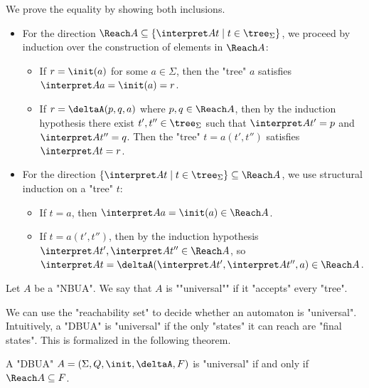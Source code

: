 \documentclass[a4paper,UKenglish,cleveref, autoref, thm-restate]{lipics-v2021}
\begin{document}
\begin{proofI}
	We prove the equality by showing both inclusions.
	\begin{itemize}
		\item For the direction $\Reach A \subseteq \setdef {\interpret A t} {t \in \tree_\Sigma}$, we proceed by induction over the construction of elements in $\Reach A$:
		      \begin{itemize}
			      \item If $r = \init(a)$ for some $a \in \Sigma$, then the "tree" $a$ satisfies $\interpret A a = \init(a) = r$.
			      \item If $r = \deltaA(p, q, a)$ where $p, q \in \Reach A$, then by the induction hypothesis there exist
			            $t', t'' \in \tree_\Sigma$ such that $\interpret A {t'} = p$ and $\interpret A {t''} = q$. Then the "tree" $t = a(t', t'')$ satisfies $\interpret A t = r$.
		      \end{itemize}

		\item For the direction $\setdef {\interpret A t} {t \in \tree_\Sigma} \subseteq \Reach A$, we use structural induction on a "tree" $t$:
		      \begin{itemize}
			      \item If $t = a$, then $\interpret A a = \init(a) \in \Reach A$.
			      \item If $t = a(t', t'')$, then by the induction hypothesis $\interpret A {t'}, \interpret A {t''} \in \Reach A$, so
			            $\interpret A t = \deltaA(\interpret A {t'}, \interpret A {t''}, a) \in \Reach A$.
		      \end{itemize}
	\end{itemize}
\end{proofI}

\begin{definition}
	\AP Let $A$ be a "NBUA". We say that $A$ is ""universal"" if it "accepts" every "tree".
\end{definition}

We can use the "reachability set" to decide whether an automaton is "universal". Intuitively, a "DBUA" is "universal" if
the only "states" it can reach are "final states". This is formalized in the following theorem.

\begin{theorem}\label{thm:universal-Reach}
	A "DBUA" $A = \DBUA$ is "universal" if and only if $\Reach A \subseteq F$.
\end{theorem}
\end{document}
